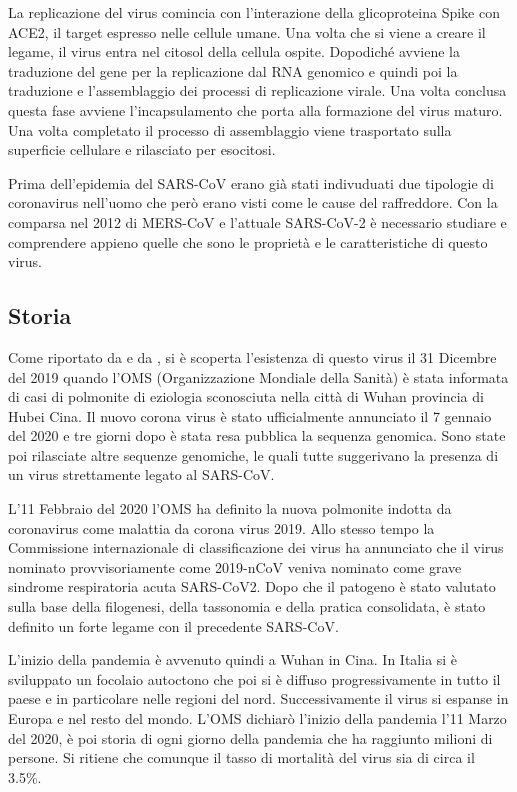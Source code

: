 La replicazione del virus comincia con l'interazione della glicoproteina Spike con ACE2, il target espresso nelle cellule umane. 
Una volta che si viene a creare il legame, il virus entra nel citosol della cellula ospite. Dopodiché avviene la traduzione del gene per la replicazione dal RNA genomico e quindi poi la traduzione e l'assemblaggio dei processi di replicazione virale. Una volta conclusa questa fase avviene l'incapsulamento che porta alla formazione del virus maturo. Una volta completato il processo di assemblaggio viene trasportato sulla superficie cellulare e rilasciato per esocitosi.

Prima dell'epidemia del SARS-CoV erano già stati indivuduati due tipologie di coronavirus nell'uomo che però erano visti come le cause del raffreddore. Con la comparsa
nel 2012 di MERS-CoV e l'attuale SARS-CoV-2 è necessario studiare e comprendere appieno quelle che sono le proprietà e le caratteristiche di questo virus. 

\subsection{Storia}\label{subsec:storiacovid}
Come riportato da \cite{StoriaCovid} e da \cite{ReportCovid}, si è scoperta l'esistenza di questo virus il 31 Dicembre del 2019 quando l'OMS (Organizzazione Mondiale della Sanità) è stata informata di casi di polmonite di eziologia sconosciuta nella città di Wuhan provincia di Hubei Cina. Il nuovo corona virus è stato ufficialmente annunciato il 7 gennaio del 2020 e tre giorni dopo è stata resa pubblica la sequenza genomica. Sono state poi rilasciate altre sequenze genomiche, le quali tutte suggerivano la presenza di un virus strettamente legato al SARS-CoV. 

L'11 Febbraio del 2020 l'OMS ha definito la nuova polmonite indotta da coronavirus come malattia da corona virus 2019. Allo stesso tempo la Commissione internazionale di classificazione dei virus ha annunciato che il virus nominato provvisoriamente come 2019-nCoV veniva nominato come grave sindrome respiratoria acuta SARS-CoV2. Dopo che il patogeno è stato valutato sulla base della filogenesi, della tassonomia e della pratica consolidata, è stato definito un forte legame con il precedente SARS-CoV. 

L'inizio della pandemia è avvenuto quindi a Wuhan in Cina. In Italia si è sviluppato un focolaio autoctono che poi si è diffuso progressivamente in tutto il paese e in particolare nelle regioni del nord. Successivamente il virus si espanse in Europa e nel resto del mondo. L'OMS dichiarò l'inizio della pandemia l'11 Marzo del 2020, è poi storia di ogni giorno della pandemia che ha raggiunto milioni di persone. Si ritiene che comunque il tasso di mortalità del virus sia di circa il 3.5\%. 

